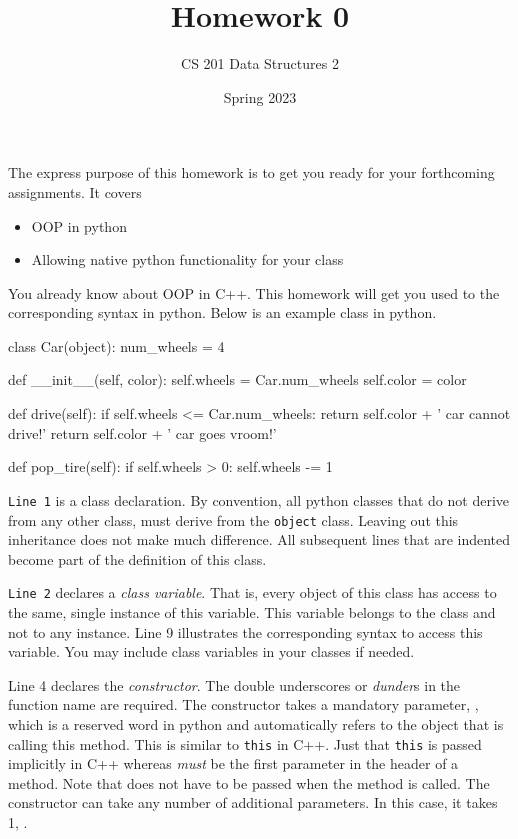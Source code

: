 \documentclass[a4paper]{exam}
\title{Homework 0}
\author{CS 201 Data Structures 2}
\date{Spring 2023}
\begin{document}
\maketitle

The express purpose of this homework is to get you ready for your forthcoming assignments. It covers
\begin{itemize}
\item OOP in python
\item Allowing native python functionality for your class
\end{itemize}

\begin{questions}

You already know about OOP in C++. This homework will get you used to the corresponding syntax in python. Below is an example class in python.

\begin{python}
class Car(object):
    num_wheels = 4

    def __init__(self, color):
        self.wheels = Car.num_wheels
        self.color = color

    def drive(self):
        if self.wheels <= Car.num_wheels:
            return self.color + ' car cannot drive!'
        return self.color + ' car goes vroom!'

    def pop_tire(self):
        if self.wheels > 0:
            self.wheels -= 1
\end{python}

\texttt{Line 1} is a class declaration. By convention, all python classes that do not derive from any other class, must derive from the \texttt{object} class. Leaving out this inheritance does not make much difference. All subsequent lines that are indented become part of the definition of this class.

\texttt{Line 2} declares a \textit{class variable}. That is, every object of this class has access to the same, single instance of this variable. This variable belongs to the class and not to any instance. Line 9 illustrates the corresponding syntax to access this variable. You may include class variables in your classes if needed.

Line 4 declares the \textit{constructor}. The double underscores or \textit{dunder}s in the function name are required. The constructor takes a mandatory parameter, , which is a reserved word in python and automatically refers to the object that is calling this method. This is similar to \texttt{this} in C++. Just that \texttt{this} is passed implicitly in C++ whereas  \textit{must} be the first parameter in the header of a method. Note that  does not have to be passed when the method is called. The constructor can take any number of additional parameters. In this case, it takes 1, .


\end{questions}
\end{document}
